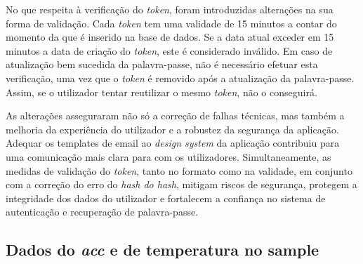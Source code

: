 No que respeita à verificação do \textit{token}, foram introduzidas alterações na sua forma de validação. Cada \textit{token} tem uma validade de 15 minutos a contar do momento da que é inserido na base de dados. Se a data atual exceder em 15 minutos a data de criação do \textit{token}, este é considerado inválido. Em caso de atualização bem sucedida da palavra-passe, não é necessário efetuar esta verificação, uma vez que o \textit{token} é removido após a atualização da palavra-passe. Assim, se o utilizador tentar reutilizar o mesmo \textit{token}, não o conseguirá.

As alterações asseguraram não só a correção de falhas técnicas, mas também a melhoria da experiência do utilizador e a robustez da segurança da aplicação. Adequar os templates de email ao \textit{design system} da aplicação contribuiu para uma comunicação mais clara para com os utilizadores. Simultaneamente, as medidas de validação do \textit{token}, tanto no formato como na validade, em conjunto com a correção do erro do \textit{hash do hash},
mitigam riscos de segurança, protegem a integridade dos dados do utilizador e fortalecem a confiança no sistema de autenticação e recuperação de palavra-passe.

\clearpage
\subsection{Dados do \textit{acc} e de temperatura no sample} %




